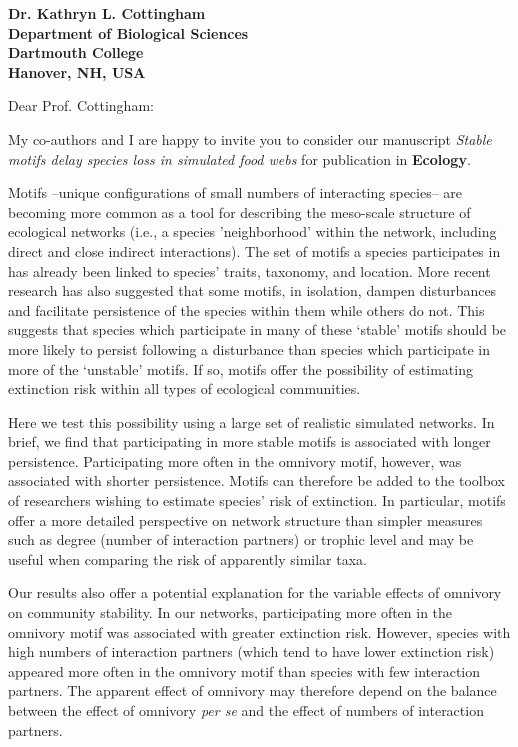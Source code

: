 \documentclass[12pt]{letter}
\begin{document}
\begin{letter}{\bf Dr. Kathryn L. Cottingham \\
Department of Biological Sciences \\
Dartmouth College \\
Hanover, NH, USA}


\opening{Dear Prof. Cottingham:}

  My co-authors and I are happy to invite you to consider our manuscript
  \emph{Stable motifs delay species loss in simulated food webs} for publication in \textbf{Ecology}.


	Motifs --unique configurations of small numbers of interacting species-- are becoming more common as a tool for describing the meso-scale structure of ecological networks (i.e., a species 'neighborhood' within the network, including direct and close indirect interactions). 
	The set of motifs a species participates in has already been linked to species' traits, taxonomy, and location.
	More recent research has also suggested that some motifs, in isolation, dampen disturbances and facilitate persistence of the species within them while others do not.
	This suggests that species which participate in many of these `stable' motifs should be more likely to persist following a disturbance than species which participate in more of the `unstable' motifs.
	If so, motifs offer the possibility of estimating extinction risk within all types of ecological communities.


	Here we test this possibility using a large set of realistic simulated networks. In brief, we find that participating in more stable motifs is associated with longer persistence. Participating more often in the omnivory motif, however, was associated with shorter persistence. Motifs can therefore be added to the toolbox of researchers wishing to estimate species' risk of extinction. In particular, motifs offer a more detailed perspective on network structure than simpler measures such as degree (number of interaction partners) or trophic level and may be useful when comparing the risk of apparently similar taxa.


 	Our results also offer a potential explanation for the variable effects of omnivory on community stability. In our networks, participating more often in the omnivory motif was associated with greater extinction risk. However, species with high numbers of interaction partners (which tend to have lower extinction risk) appeared more often in the omnivory motif than species with few interaction partners. The apparent effect of omnivory may therefore depend on the balance between the effect of omnivory \emph{per se} and the effect of numbers of interaction partners.



\end{letter}
\end{document}
